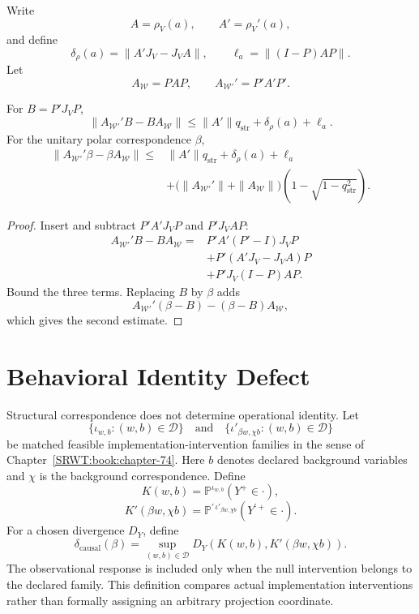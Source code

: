 
Write
\[
A=\rho_V(a),
\qquad
A'=\rho_V'(a),
\]
and define
\[
\delta_\rho(a)=\|A'J_V-J_VA\|,
\qquad
\ell_a=\|(I-P)AP\|.
\]
Let
\[
A_{\mathcal W}=PAP,
\qquad
A_{\mathcal W'}'=P'A'P'.
\]

\begin{SRWTproposition}\label{SRWT:prop:operation-transport-bound}
For \(B=P'J_VP\),
\[
\boxed{
\|A_{\mathcal W'}'B-BA_{\mathcal W}\|
\leq
\|A'\|q_{\mathrm{str}}
+\delta_\rho(a)
+\ell_a.
}
\]
For the unitary polar correspondence \(\beta\),
\[
\boxed{
\begin{aligned}
\|A_{\mathcal W'}'\beta-\beta A_{\mathcal W}\|
\leq
&\|A'\|q_{\mathrm{str}}
+\delta_\rho(a)
+\ell_a\\
&+
\bigl(\|A_{\mathcal W'}'\|+\|A_{\mathcal W}\|\bigr)
\left(1-\sqrt{1-q_{\mathrm{str}}^2}\right).
\end{aligned}
}
\]
\end{SRWTproposition}

\begin{proof}
Insert and subtract \(P'A'J_VP\) and \(P'J_VAP\):
\[
\begin{aligned}
A_{\mathcal W'}'B-BA_{\mathcal W}
={}&P'A'(P'-I)J_VP\\
&+P'(A'J_V-J_VA)P\\
&+P'J_V(I-P)AP.
\end{aligned}
\]
Bound the three terms. Replacing \(B\) by \(\beta\) adds
\[
A_{\mathcal W'}'(\beta-B)-(\beta-B)A_{\mathcal W},
\]
which gives the second estimate.
\end{proof}

\section{Behavioral Identity Defect}

Structural correspondence does not determine operational identity. Let
\[
\{\iota_{w,b}:(w,b)\in\mathcal D\}
\quad\text{and}\quad
\{\iota'_{\beta w,\chi b}:(w,b)\in\mathcal D\}
\]
be matched feasible implementation-intervention families in the sense of
Chapter~\ref{SRWT:book:chapter-74}. Here \(b\) denotes declared background variables and \(\chi\) is
the background correspondence. Define
\[
K(w,b)
=
\mathbb P^{\iota_{w,b}}(Y^+\in\cdot),
\]
\[
K'(\beta w,\chi b)
=
\mathbb P^{\prime\,\iota'_{\beta w,\chi b}}(Y^{\prime+}\in\cdot).
\]
For a chosen divergence \(D_Y\), define
\[
\boxed{
\delta_{\mathrm{causal}}(\beta)
=
\sup_{(w,b)\in\mathcal D}
D_Y\left(
K(w,b),
K'(\beta w,\chi b)
\right).
}
\]
The observational response is included only when the null intervention belongs
to the declared family. This definition compares actual implementation
interventions rather than formally assigning an arbitrary projection
coordinate.

